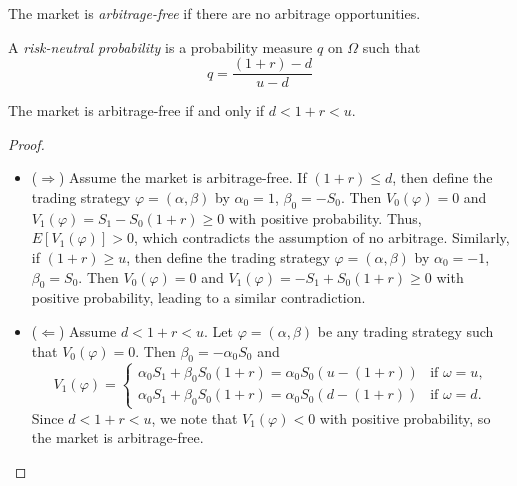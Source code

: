 \begin{definition}\label{def:arbitrage_free}
    \leanok
    The market is \emph{arbitrage-free} if there are no arbitrage opportunities.
\end{definition}

\begin{definition}\label{def:risk_neutral_probability}
    \leanok
    A \emph{risk-neutral probability} is a probability measure $q$ on $\Omega$ such that
    \[
        q = \frac{(1 + r) - d}{u - d}
    \]
\end{definition}

\begin{lemma}\label{lem:arbitrage_free_condition}
    \notready
    The market is arbitrage-free if and only if $d < 1 + r < u$.
\end{lemma}

\begin{proof}
    \begin{itemize}
        \item ($\Rightarrow$) Assume the market is arbitrage-free. If $(1 + r) \leq d$, then define the trading strategy $\varphi = (\alpha, \beta)$ by $\alpha_0 = 1$, $\beta_0 = -S_0$.
            Then $V_0(\varphi) = 0$ and $V_1(\varphi) = S_1 - S_0 (1 + r) \geq 0$ with positive probability. Thus, $E[V_1(\varphi)] > 0$, which contradicts the assumption of no arbitrage. 
            Similarly, if $(1 + r) \geq u$, then define the trading strategy $\varphi = (\alpha, \beta)$ by $\alpha_0 = -1$, $\beta_0 = S_0$.
            Then $V_0(\varphi) = 0$ and $V_1(\varphi) = -S_1 + S_0 (1 + r) \geq 0$ with positive probability, leading to a similar contradiction.
        \item ($\Leftarrow$) Assume $d < 1 + r < u$. Let $\varphi = (\alpha, \beta)$ be any trading strategy such that $V_0(\varphi) = 0$. Then $\beta_0 = -\alpha_0 S_0$ and
            \[
                V_1(\varphi) = 
                \begin{cases}
                    \alpha_0 S_1 + \beta_0 S_0 (1 + r) = \alpha_0 S_0(u - (1 + r)) & \text{if } \omega = u,  \\
                    \alpha_0 S_1 + \beta_0 S_0 (1 + r) = \alpha_0 S_0(d - (1 + r)) & \text{if } \omega = d.
                \end{cases}    
            \]
            Since $d < 1 + r < u$, we note that $V_1(\varphi) < 0$ with positive probability, so the market is arbitrage-free.
        \end{itemize}
\end{proof}


